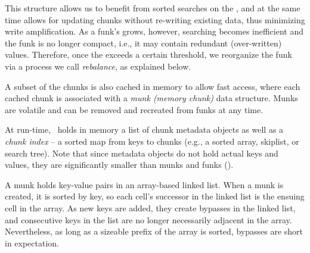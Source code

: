 
This structure allows us to benefit from sorted searches on the , and at the same time
allows for updating chunks without re-writing existing data, thus minimizing write amplification.
As a funk's   grows, however, searching becomes inefficient   and  
the funk is no longer compact, i.e., it may contain redundant (over-written) values.
Therefore, once the   exceeds a certain threshold, we reorganize the funk
via a process we call \emph{rebalance}, as explained below.

A subset of the chunks is also cached in memory to allow fast access, where each cached chunk is associated with a
\emph{munk (memory chunk)}  data structure. 
Munks are volatile and can be removed and recreated from funks at any time.

At run-time, \sys\ holds in memory a list of chunk metadata objects as well as 
a \emph{chunk index} -- a sorted map from keys to chunks (e.g., a sorted array, skiplist, or search tree).
Note that since metadata objects do not hold actual keys and values, they are significantly smaller than munks and funks
({}).

A munk holds key-value pairs in an array-based linked list.  
When a munk is created, 
it is sorted by key, so each cell's successor in the linked list is the ensuing cell in the array.
As new keys are added, they create bypasses in the linked list, and consecutive keys in the
list are no longer necessarily adjacent in the array. Nevertheless, as long as 
a sizeable prefix of the  array  is sorted, bypasses are short in expectation.



